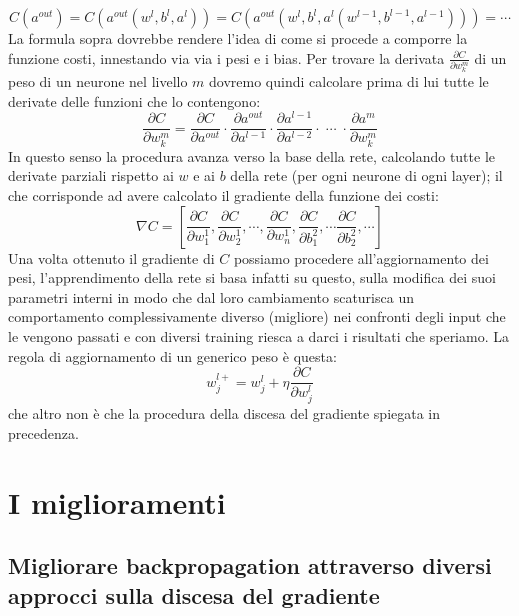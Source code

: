 \begin{equation}
	C(a^{out})= C( a^{out}(w^{l},b^{l}, a^{l})) = C( a^{out}(w^{l},b^{l}, a^{l}(w^{l-1},b^{l-1}, a^{l-1}))) = \cdots
\end{equation}
La formula sopra dovrebbe rendere l'idea di come si procede a comporre la funzione costi, innestando via via i pesi e i bias. Per trovare la derivata $\frac{\partial C}{\partial w_{k}^{m}} $ di un peso di un neurone nel livello $m$ dovremo quindi calcolare prima di lui tutte le derivate delle funzioni che lo contengono:
\begin{equation}
	\dfrac{\partial C}{\partial w_{k}^{m}} = \dfrac{\partial C}{\partial a^{out}}\cdot \dfrac{\partial a^{out}}{\partial a^{l-1}} \cdot \dfrac{\partial a^{l-1}}{\partial a^{l-2}}\cdot \; \cdots \; \cdot \dfrac{\partial a^{m}}{\partial w^{m}_{k}}
\end{equation} 
In questo senso la procedura avanza verso la base della rete, calcolando tutte le derivate parziali rispetto ai $w$ e ai $b$ della rete (per ogni neurone di ogni layer); il che corrisponde ad avere calcolato il gradiente della funzione dei costi:
\begin{equation}
	\nabla C = \left[ \dfrac{\partial C}{\partial w_{1}^{1}}, \dfrac{\partial C}{\partial w_{2}^{1}}, \cdots, \dfrac{\partial C}{\partial w_{n}^{1}},\dfrac{\partial C}{\partial b_{1}^{2}}, \cdots \dfrac{\partial C}{\partial b_{2}^{2}}, \cdots \right] 
\end{equation} 
Una volta ottenuto il gradiente di $C$ possiamo procedere all'aggiornamento dei pesi, l'apprendimento della rete si basa infatti su questo, sulla modifica dei suoi parametri interni in modo che dal loro cambiamento scaturisca un comportamento complessivamente diverso (migliore) nei confronti degli input che le vengono passati e con diversi training riesca a darci i risultati che speriamo.
La regola di aggiornamento di un generico peso è questa:
\begin{equation}
	w_{j}^{l +} = w_{j}^{l} + \eta \dfrac{\partial C}{\partial w_{j}^{l}}
\end{equation}
che altro non è che la procedura della discesa del gradiente spiegata in precedenza.

\section{I miglioramenti}
\subsection*{Migliorare backpropagation attraverso diversi approcci sulla discesa del gradiente}

